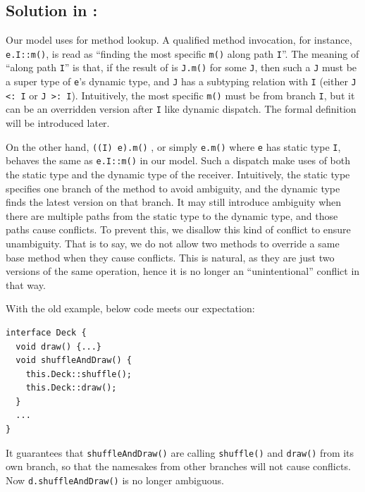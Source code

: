 \subsection{Solution in \MIM: \dispatchnamecaptical}
Our \MIM{} model uses \dispatchnameit{} for method lookup. A qualified method invocation, for instance, \lstinline|e.I::m()|, is read as ``finding the most specific \lstinline|m()| along path \lstinline|I|''. The meaning of ``along path \lstinline|I|'' is that, if the result of \dispatch{} is \lstinline|J.m()| for some \lstinline|J|, then such a \lstinline|J| must be a super type of \lstinline|e|'s dynamic type, and \lstinline|J| has a subtyping relation with \lstinline|I| (either \lstinline|J <: I| or \lstinline|J >: I|). Intuitively, the most specific \lstinline|m()| must be from branch \lstinline|I|, but it can be an overridden version after \lstinline|I| like dynamic dispatch. The formal definition will be introduced later.

On the other hand, \lstinline|((I) e).m()| , or simply \lstinline|e.m()| where \lstinline|e| has static type \lstinline|I|, behaves the same as \lstinline|e.I::m()| in our model. Such a dispatch make uses of both the static type and the dynamic type of the receiver. Intuitively, the static type specifies one branch of the method to avoid ambiguity, and the dynamic type finds the latest version on that branch. It may still introduce ambiguity when there are multiple paths from the static type to the dynamic type, and those paths cause conflicts. To prevent this, we disallow this kind of conflict to ensure unambiguity. That is to say, we do not allow two methods to override a same base method when they cause conflicts. This is natural, as they are just two versions of the same operation, hence it is no longer an ``unintentional'' conflict in that way.

With the old example, below code meets our expectation:
\vspace{3pt}\begin{lstlisting}
interface Deck {
  void draw() {...}
  void shuffleAndDraw() {
    this.Deck::shuffle();
    this.Deck::draw();
  }
  ...
}
\end{lstlisting}\vspace{3pt}
It guarantees that \lstinline|shuffleAndDraw()| are calling \lstinline|shuffle()| and \lstinline|draw()| from its own branch, so that the namesakes
from other branches will not cause conflicts. Now \lstinline|d.shuffleAndDraw()| is no longer ambiguous.

